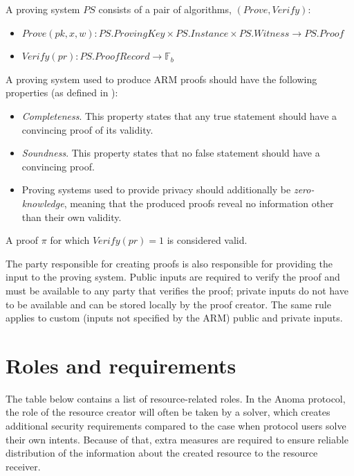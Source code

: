 \documentclass[
    11pt,            %
    techreport,        %
    affiltop,       %
]{art}
\begin{document}
A proving system $PS$ consists of a pair of algorithms, $(Prove, Verify)$:

\begin{itemize}
    \item $Prove(pk, x, w): PS.ProvingKey \times PS.Instance \times PS.Witness \rightarrow PS.Proof$
    \item $Verify(pr): PS.ProofRecord \rightarrow \mathbb{F}_b$
\end{itemize}

A proving system used to produce ARM proofs should have the following properties (as defined in \cite{thaler}):
\begin{itemize}
    \item \textit{Completeness}. This property states that any true statement should have a convincing proof of its validity.
    \item \textit{Soundness}. This property states that no false statement should have a convincing proof.
    \item Proving systems used to provide privacy should additionally be \textit{zero-knowledge}, meaning that the produced proofs reveal no information other than their own validity.
\end{itemize}

A proof $\pi$ for which $Verify(pr) = 1$ is considered valid.

The party responsible for creating proofs is also responsible for providing the input to the proving system. Public inputs are required to verify the proof and must be available to any party that verifies the proof; private inputs do not have to be available and can be stored locally by the proof creator. The same rule applies to custom (inputs not specified by the ARM) public and private inputs.


\section{Roles and requirements}

The table below contains a list of resource-related roles. In the Anoma protocol, the role of the resource creator will often be taken by a solver, which creates additional security requirements compared to the case when protocol users solve their own intents. Because of that, extra measures are required to ensure reliable distribution of the information about the created resource to the resource receiver. 
\end{document}
